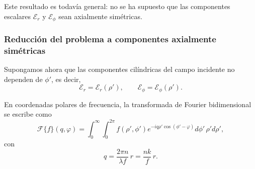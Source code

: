 Este resultado es todavía general: no se ha supuesto que las componentes escalares $\mathscr E_r$ y $\mathscr E_\phi$ sean axialmente simétricas.

\subsubsection{Reducción del problema a componentes axialmente simétricas}

Supongamos ahora que las componentes cilíndricas del campo incidente no dependen de $\phi'$, es decir,
\begin{equation}
  \mathscr E_r=\mathscr E_r(\rho'),
  \qquad
  \mathscr E_\phi=\mathscr E_\phi(\rho').
\end{equation}

En coordenadas polares de frecuencia, la transformada de Fourier bidimensional se escribe como
\begin{equation}
  \mathscr F\{f\}(q,\varphi)
  =
  \int_0^\infty
  \int_0^{2\pi}
  f(\rho',\phi')
  e^{-iq\rho'\cos(\phi'-\varphi)}
  d\phi'\,\rho' d\rho',
  \label{eq:fourier_polar_cylindrical}
\end{equation}
con
\begin{equation}
  q=\frac{2\pi n}{\lambda f}\,r=\frac{nk}{f}\,r.
\end{equation}

